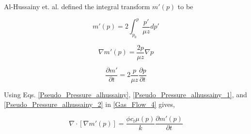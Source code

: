 \documentclass{llncs}
\numberwithin{equation}{section}
\numberwithin{figure}{section}
\numberwithin{table}{section}
\begin{document}
    Al-Hussainy et. al. \cite{Al-Hussainy_1966_1} defined the integral transform $m'(p)$ to be

    \begin{equation}
        m'\left( p \right)=2\int_{{{p}_{0}}}^{p}{\frac{p'}{\mu z}dp'}
        \label{Pseudo_Pressure_alhussainy}
    \end{equation}

    \begin{equation}
        \nabla m'\left( p \right)=\frac{2p}{\mu z}\nabla p
        \label{Pseudo_Pressure_alhussainy_1}
    \end{equation}

    \begin{equation}
        \frac{\partial m'}{\partial t}=2\frac{p}{\mu z}\frac{\partial p}{\partial t}
        \label{Pseudo_Pressure_alhussainy_2}
    \end{equation}

    Using Eqs. \ref{Pseudo_Pressure_alhussainy}, \ref{Pseudo_Pressure_alhussainy_1}, and \ref{Pseudo_Pressure_alhussainy_2} in \ref{Gas_Flow_4} gives,

    \begin{equation}
        \nabla \cdot \left[ \nabla m'\left( p \right) \right]=\frac{\phi {{c}_{t}}\mu \left( p \right)}{k}\frac{\partial m'\left( p \right)}{\partial t}
        \label{Gas_Flow_Final}
    \end{equation}
\end{document}
